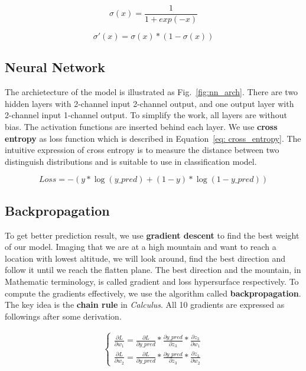 \documentclass[12pt,a4paper]{article}
\begin{document}
\begin{equation} \label{eq: sigmoid}
  \sigma(x) = \frac{1}{1+exp(-x)}
\end{equation}

\begin{equation} \label{eq: derivative_sigmoid}
  \sigma'(x) = \sigma(x)*(1-\sigma(x))
\end{equation}
\subsection{Neural Network}
The archietecture of the model is illustrated as Fig.~\ref{fig:nn_arch}. There are two hidden layers with 2-channel input 2-channel output, and one output layer with 2-channel input 1-channel output. To simplify the work, all layers are without bias. The activation functions are inserted behind each layer. We use \textbf{cross entropy} as loss function which is described in Equation~\ref{eq: cross_entropy}. The intuitive expression of cross entropy is to measure the distance between two distinguish distributions and is suitable to use in classification model.

\begin{equation} \label{eq: cross_entropy}
  Loss = -(y*\log(y\_pred) + (1-y)*\log(1-y\_pred))
\end{equation}
\subsection{Backpropagation}
To get better prediction result, we use \textbf{gradient descent} to find the best weight of our model. Imaging that we are at a high mountain and want to reach a location with lowest altitude, we will look around, find the best direction and follow it until we reach the flatten plane. The best direction and the mountain, in Mathematic terminology, is called gradient and loss hypersurface respectively. To compute the gradients effectively, we use the algorithm called \textbf{backpropagation}. The key idea is the \textbf{chain rule} in \textit{Calculus}. All 10 gradients are expressed as followings after some derivation.

\begin{eqnarray}
  \left\{
  \begin{aligned}
    \frac{\partial L}{\partial w_1} = \frac{\partial L}{\partial y\_pred} * \frac{\partial y\_pred}{\partial z_3} * \frac{\partial z_3}{\partial w_1} \\
    \frac{\partial L}{\partial w_2} = \frac{\partial L}{\partial y\_pred} * \frac{\partial y\_pred}{\partial z_3} * \frac{\partial z_3}{\partial w_2}
  \end{aligned}
  \right.
  \label{eq: L_to_W3}
\end{eqnarray}
\end{document}
